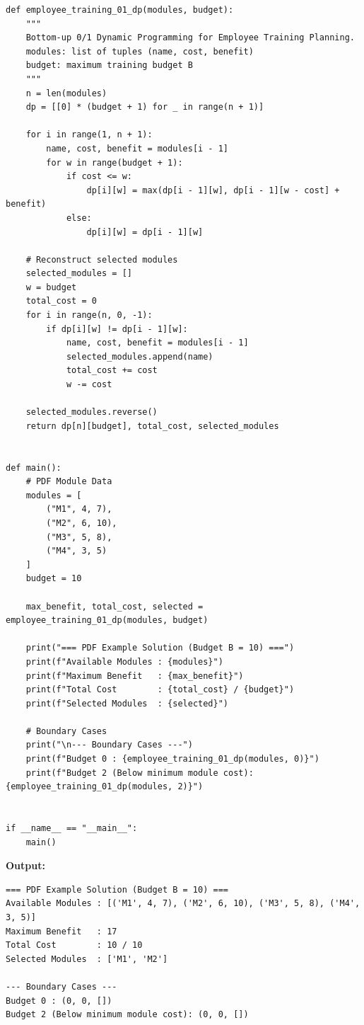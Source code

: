 \documentclass[12pt]{article}
\begin{document}
\begin{lstlisting}[style=code]
def employee_training_01_dp(modules, budget):
    """
    Bottom-up 0/1 Dynamic Programming for Employee Training Planning.
    modules: list of tuples (name, cost, benefit)
    budget: maximum training budget B
    """
    n = len(modules)
    dp = [[0] * (budget + 1) for _ in range(n + 1)]

    for i in range(1, n + 1):
        name, cost, benefit = modules[i - 1]
        for w in range(budget + 1):
            if cost <= w:
                dp[i][w] = max(dp[i - 1][w], dp[i - 1][w - cost] + benefit)
            else:
                dp[i][w] = dp[i - 1][w]

    # Reconstruct selected modules
    selected_modules = []
    w = budget
    total_cost = 0
    for i in range(n, 0, -1):
        if dp[i][w] != dp[i - 1][w]:
            name, cost, benefit = modules[i - 1]
            selected_modules.append(name)
            total_cost += cost
            w -= cost

    selected_modules.reverse()
    return dp[n][budget], total_cost, selected_modules


def main():
    # PDF Module Data
    modules = [
        ("M1", 4, 7),
        ("M2", 6, 10),
        ("M3", 5, 8),
        ("M4", 3, 5)
    ]
    budget = 10

    max_benefit, total_cost, selected = employee_training_01_dp(modules, budget)

    print("=== PDF Example Solution (Budget B = 10) ===")
    print(f"Available Modules : {modules}")
    print(f"Maximum Benefit   : {max_benefit}")
    print(f"Total Cost        : {total_cost} / {budget}")
    print(f"Selected Modules  : {selected}")

    # Boundary Cases
    print("\n--- Boundary Cases ---")
    print(f"Budget 0 : {employee_training_01_dp(modules, 0)}")
    print(f"Budget 2 (Below minimum module cost): {employee_training_01_dp(modules, 2)}")


if __name__ == "__main__":
    main()
\end{lstlisting}

\textbf{Output:}

\begin{lstlisting}[style=output]
=== PDF Example Solution (Budget B = 10) ===
Available Modules : [('M1', 4, 7), ('M2', 6, 10), ('M3', 5, 8), ('M4', 3, 5)]
Maximum Benefit   : 17
Total Cost        : 10 / 10
Selected Modules  : ['M1', 'M2']

--- Boundary Cases ---
Budget 0 : (0, 0, [])
Budget 2 (Below minimum module cost): (0, 0, [])
\end{lstlisting}
\end{document}
